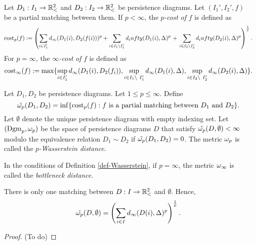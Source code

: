 \begin{definition}
    Let $ D_1: I_1 \to \mathbb{R}_<^2 $ and $ D_2: I_2 \to \mathbb{R}_<^2 $ be persistence diagrams. Let $ (I_1', I_2', f) $ be a partial matching between them. If $ p < \infty $, the {\it $p$-cost of $ f $} is defined as
    \begin{align*}
        \operatorname{cost}_p(f) := \left(\sum_{i\in I_1'}d_\infty(D_1(i), D_2(f(i)))^p + \sum_{i \in I_1 \backslash I_1'} d_infty (D_1(i), \Delta)^p \right. 
         + \left.\sum_{i \in I_2 \backslash I_2'} d_infty (D_2(i), \Delta)^p \right)^{\frac{1}{p}}.
    \end{align*}
    For $ p = \infty $, the {\it $\infty$-cost of $ f $} is defined as
    \begin{align*}
        \operatorname{cost}_\infty(f) := \max \{\sup_{i \in I_1'} d_\infty(D_1(i), D_2(f_i)), \sup_{i\in I_1 \backslash \ I_1'} d_\infty(D_1(i), \Delta), \sup_{i\in I_2 \backslash \ I_2'} d_\infty(D_2(i), \Delta)\}.
    \end{align*}
\end{definition}

\begin{definition} \label{def-Wasserstein}
    Let $ D_1, D_2 $ be persistence diagrams. Let $ 1 \leq p \leq \infty $. Define
    $$
        \tilde {\omega_p} (D_1, D_2) = \inf \{\operatorname{cost}_p(f) : f \text{ is a partial matching between } D_1 \text{ and } D_2 \}.
    $$
    Let $ \emptyset $ denote the unique persistence diagram with empty indexing set. Let $ (\operatorname{Dgm}_p, \omega_p) $ be the space of persistence diagrams $ D $ that satisfy $ \tilde {\omega_p}(D, \emptyset) < \infty $ modulo the equivalence relation $ D_1 \sim D_2 $ if $ \tilde {\omega_p} (D_1, D_2) = 0 $. The metric $ \omega_p $ is called the {\it $p$-Wasserstein distance}.
\end{definition}

\begin{definition}
    In the conditions of Definition \ref{def-Wasserstein}, if $ p = \infty $, the metric $ \omega_\infty $ is called the {\it bottleneck distance}.
\end{definition}

\begin{proposition} \label{prop-empty-mathing-distance}
    There is only one matching between $ D: I \to \mathbb{R}_<^2 $ and $ \emptyset $. Hence,
    $$
        \tilde {\omega_p}(D, \emptyset) = \left(\sum_{i\in I} d_\infty(D(i), \Delta)^p\right)^{\frac{1}{p}}.
    $$
\end{proposition}
\begin{proof}
    (To do)
\end{proof}


